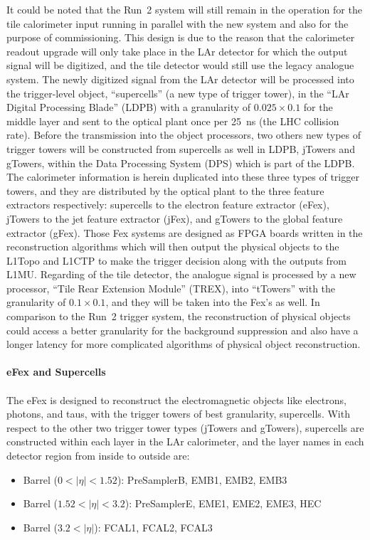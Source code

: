 It could be noted that the Run~2 system will still remain in the operation for the tile calorimeter input running in parallel with the new system and also for the purpose of commissioning. This design is due to the reason that the calorimeter readout upgrade will only take place in the LAr detector for which the output signal will be digitized, and the tile detector would still use the legacy analogue system. The newly digitized signal from the LAr detector will be processed into the trigger-level object, ``supercells'' (a new type of trigger tower), in the ``LAr Digital Processing Blade'' (LDPB) with a granularity of $0.025\times0.1$ for the middle layer and sent to the optical plant once per 25~ns (the LHC collision rate). Before the transmission into the object processors, two others new types of trigger towers will be constructed from supercells as well in LDPB, jTowers and gTowers, within the Data Processing System (DPS) which is part of the LDPB. The calorimeter information is herein duplicated into these three types of trigger towers, and they are distributed by the optical plant to the three feature extractors respectively: supercells to the electron feature extractor (eFex), jTowers to the jet feature extractor (jFex), and gTowers to the global feature extractor (gFex). Those Fex systems are designed as FPGA boards written in the reconstruction algorithms which will then output the physical objects to the L1Topo and L1CTP to make the trigger decision along with the outputs from L1MU. Regarding of the tile detector, the analogue signal is processed by a new processor, ``Tile Rear Extension Module'' (TREX), into ``tTowers'' with the granularity of $0.1\times0.1$, and they will be taken into the Fex's as well. In comparison to the Run~2 trigger system, the reconstruction of physical objects could access a better granularity for the background suppression and also have a longer latency for more complicated algorithms of physical object reconstruction.   
\\
\\{\bf eFex and Supercells}
\\
\\The eFex is designed to reconstruct the electromagnetic objects like electrons, photons, and taus, with the trigger towers of best granularity, supercells. With respect to the other two trigger tower types (jTowers and gTowers), supercells are constructed within each layer in the LAr calorimeter, and the layer names in each detector region from inside to outside are:
\begin{itemize}
	\item Barrel ($0<|\eta|<1.52$): PreSamplerB, EMB1, EMB2, EMB3 
	\item Barrel ($1.52<|\eta|<3.2$): PreSamplerE, EME1, EME2, EME3, HEC
	\item Barrel ($3.2<|\eta|$): FCAL1, FCAL2, FCAL3
\end{itemize}
